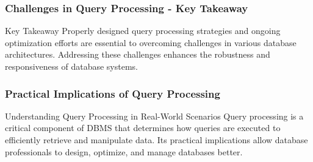 \documentclass[aspectratio=169]{beamer}
\begin{document}
\begin{frame}[fragile]
    \frametitle{Challenges in Query Processing - Key Takeaway}
    \begin{block}{Key Takeaway}
        Properly designed query processing strategies and ongoing optimization efforts are essential to overcoming challenges in various database architectures. Addressing these challenges enhances the robustness and responsiveness of database systems.
    \end{block}
\end{frame}

\begin{frame}[fragile]
    \frametitle{Practical Implications of Query Processing}
    \begin{block}{Understanding Query Processing in Real-World Scenarios}
        Query processing is a critical component of DBMS that determines how queries are executed to efficiently retrieve and manipulate data. Its practical implications allow database professionals to design, optimize, and manage databases better.
    \end{block}
\end{frame}
\end{document}
